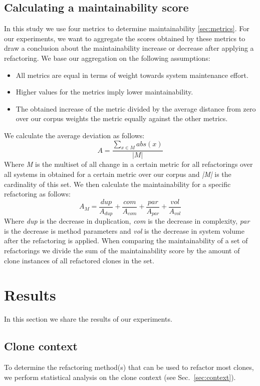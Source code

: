 \documentclass[sigconf,review, table]{acmart}
\begin{document}
\subsection{Calculating a maintainability score}\label{sec:metricformula}
In this study we use four metrics to determine maintainability \ref{sec:metrics}. For our experiments, we want to aggregate the scores obtained by these metrics to draw a conclusion about the maintainability increase or decrease after applying a refactoring. We base our aggregation on the following assumptions:
\begin{itemize}
  \item All metrics are equal in terms of weight towards system maintenance effort.
  \item Higher values for the metrics imply lower maintainability.
  \item The obtained increase of the metric divided by the average distance from zero over our corpus weights the metric equally against the other metrics.
\end{itemize}
We calculate the average deviation as follows:
\begin{equation}\label{eq:scoredev}
A = \frac{\sum_{x \in M} abs(x)}{|M|}
\end{equation}
Where \textit{M} is the multiset of all change in a certain metric for all refactorings over all systems in  obtained for a certain metric over our corpus and \textit{|M|} is the cardinality of this set. We then calculate the maintainability for a specific refactoring as follows:
\begin{equation}\label{eq:scoreref}
A_M = \frac{dup}{A_{dup}} + \frac{com}{A_{com}} + \frac{par}{A_{par}} + \frac{vol}{A_{vol}}
\end{equation}
Where \textit{dup} is the decrease in duplication, \textit{com} is the decrease in complexity, \textit{par} is the decrease is method parameters and \textit{vol} is the decrease in system volume after the refactoring is applied. When comparing the maintainability of a set of refactorings we divide the sum of the maintainability score by the amount of clone instances of all refactored clones in the set.

\section{Results}
In this section we share the results of our experiments.

\subsection{Clone context}
To determine the refactoring method(s) that can be used to refactor most clones, we perform statistical analysis on the clone context (see Sec.~\ref{sec:context}).
\end{document}
